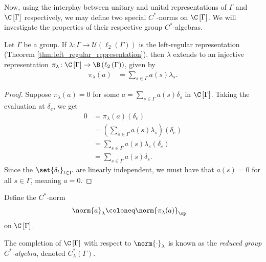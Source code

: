 Now, using the interplay between unitary and unital representations of $\Gamma$ and $\C\left[ \Gamma \right]$ respectively, we may define two special $C^{\ast}$-norms on $\C\left[ \Gamma \right]$. We will investigate the properties of their respective group $C^{\ast}$-algebras.
\begin{proposition}
  Let $\Gamma$ be a group. If $\lambda\colon\Gamma\rightarrow \mathcal{U}\left( \ell_2\left( \Gamma \right) \right)$ is the left-regular representation (Theorem \ref{thm:left_regular_representation}), then $\lambda$ extends to an injective representation $\pi_{\lambda}\colon \C\left[ \Gamma \right]\rightarrow \B\left( \ell_2\left( \Gamma \right) \right)$, given by
  \begin{align*}
    \pi_{\lambda}(a) &= \sum_{s\in\Gamma}a(s)\lambda_s.
  \end{align*}
\end{proposition}
\begin{proof}
  Suppose $\pi_{\lambda}(a) = 0$ for some $a = \sum_{s\in\Gamma}a(s)\delta_s$ in $\C\left[ \Gamma \right]$. Taking the evaluation at $\delta_{e}$, we get
  \begin{align*}
    0 &= \pi_{\lambda}\left( a \right)\left( \delta_e \right)\\
      &= \left( \sum_{s\in\Gamma}a(s)\lambda_s \right)\left( \delta_e \right)\\
      &= \sum_{s\in\Gamma}a(s)\lambda_s\left( \delta_e \right)\\
      &= \sum_{s\in\Gamma}a(s)\delta_s.
  \end{align*}
  Since the $\set{\delta_t}_{t\in\Gamma}$ are linearly independent, we must have that $a(s) = 0$ for all $s\in\Gamma$, meaning $a = 0$.
\end{proof}
\begin{definition}\label{def:reduced_group_cstar_algebra}
  Define the $C^{\ast}$-norm
  \begin{align*}
    \norm{a}_{\lambda} &\coloneq \norm{\pi_{\lambda}(a)}_{\op}
  \end{align*}
  on $\C\left[ \Gamma \right]$.\newline

  The completion of $\C\left[ \Gamma \right]$ with respect to $\norm{\cdot}_{\lambda}$ is known as the \textit{reduced group $C^{\ast}$-algebra}, denoted $C^{\ast}_{\lambda}\left( \Gamma \right)$.
\end{definition}
